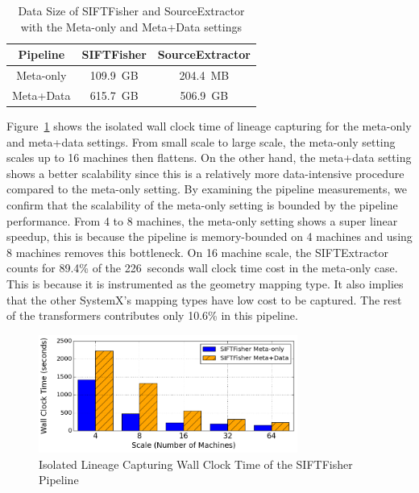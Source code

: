 \documentclass{sig-alternate}
\begin{document}
\begin{table}[t]
\begin{center}
    \caption{Data Size of SIFTFisher and SourceExtractor with the Meta-only and Meta+Data settings}
    \begin{scriptsize}
    \begin{tabular}{ | c | c | c| }
    \hline
    Pipeline & SIFTFisher & SourceExtractor \\ \hline \hline
    Meta-only & 109.9~GB & 204.4~MB \\ \hline
    Meta+Data & 615.7~GB & 506.9~GB \\ \hline
    \end{tabular}
    \end{scriptsize}
    \label{tb:apps-stats}
\end{center}   
\end{table}

Figure~\ref{fig:VOC-overhead} shows the isolated wall clock time of lineage capturing for the meta-only and meta+data
settings. From small scale to large scale, the meta-only setting scales up to 16 machines then flattens. 
On the other hand, the meta+data setting shows a better scalability since this is a relatively more
data-intensive procedure compared to the meta-only setting. 
By examining the pipeline measurements, we confirm that the scalability of the meta-only setting is bounded
by the pipeline performance.
From 4 to 8 machines, the meta-only setting shows a super linear speedup, this is because the pipeline is memory-bounded on 4 machines
and using 8 machines removes this bottleneck.
On 16 machine scale, the SIFTExtractor counts for 89.4\% of the 226~seconds wall clock time cost in the meta-only case.
This is because it is instrumented as the geometry mapping type.
It also implies that the other SystemX's mapping types have low cost to be captured.
The rest of the transformers contributes only 10.6\% in this pipeline. 

\begin{figure}[t]
\begin{center}
    \includegraphics[width=85mm]{pictures/Overhead-Time-VOC}
\caption {Isolated Lineage Capturing Wall Clock Time of the SIFTFisher Pipeline
    \label{fig:VOC-overhead}
}
\end{center}
\end{figure}
\end{document}
